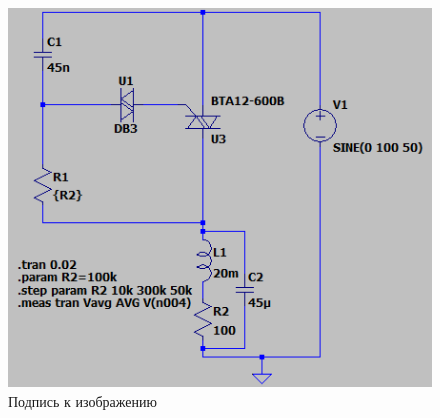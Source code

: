 \documentclass[a4paper, 12pt]{article}
\begin{document}
    \begin{figure}[H]
        \centering
        \includegraphics[scale=0.5]{scheme6.png}
        \captionsetup{skip=0pt}
        \caption{Подпись к изображению}
        \label{fig:scheme6}
    \end{figure}
\end{document}
